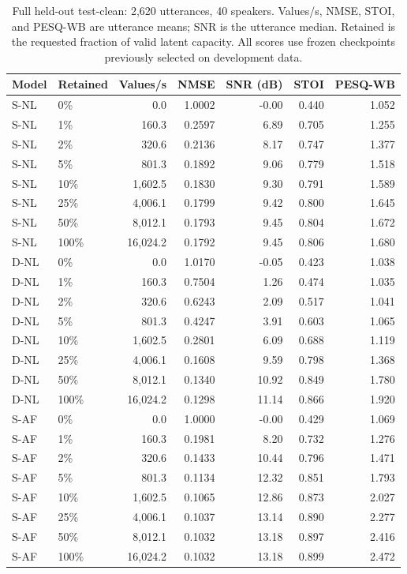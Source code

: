 \begin{table}[!htbp]
\centering\small
\begin{tabular}{llrrrrr}
\toprule
Model & Retained & Values/s & NMSE & SNR (dB) & STOI & PESQ-WB \\
\midrule
S-NL & 0\% & 0.0 & 1.0002 & -0.00 & 0.440 & 1.052 \\
S-NL & 1\% & 160.3 & 0.2597 & 6.89 & 0.705 & 1.255 \\
S-NL & 2\% & 320.6 & 0.2136 & 8.17 & 0.747 & 1.377 \\
S-NL & 5\% & 801.3 & 0.1892 & 9.06 & 0.779 & 1.518 \\
S-NL & 10\% & 1,602.5 & 0.1830 & 9.30 & 0.791 & 1.589 \\
S-NL & 25\% & 4,006.1 & 0.1799 & 9.42 & 0.800 & 1.645 \\
S-NL & 50\% & 8,012.1 & 0.1793 & 9.45 & 0.804 & 1.672 \\
S-NL & 100\% & 16,024.2 & 0.1792 & 9.45 & 0.806 & 1.680 \\
\midrule
D-NL & 0\% & 0.0 & 1.0170 & -0.05 & 0.423 & 1.038 \\
D-NL & 1\% & 160.3 & 0.7504 & 1.26 & 0.474 & 1.035 \\
D-NL & 2\% & 320.6 & 0.6243 & 2.09 & 0.517 & 1.041 \\
D-NL & 5\% & 801.3 & 0.4247 & 3.91 & 0.603 & 1.065 \\
D-NL & 10\% & 1,602.5 & 0.2801 & 6.09 & 0.688 & 1.119 \\
D-NL & 25\% & 4,006.1 & 0.1608 & 9.59 & 0.798 & 1.368 \\
D-NL & 50\% & 8,012.1 & 0.1340 & 10.92 & 0.849 & 1.780 \\
D-NL & 100\% & 16,024.2 & 0.1298 & 11.14 & 0.866 & 1.920 \\
\midrule
S-AF & 0\% & 0.0 & 1.0000 & -0.00 & 0.429 & 1.069 \\
S-AF & 1\% & 160.3 & 0.1981 & 8.20 & 0.732 & 1.276 \\
S-AF & 2\% & 320.6 & 0.1433 & 10.44 & 0.796 & 1.471 \\
S-AF & 5\% & 801.3 & 0.1134 & 12.32 & 0.851 & 1.793 \\
S-AF & 10\% & 1,602.5 & 0.1065 & 12.86 & 0.873 & 2.027 \\
S-AF & 25\% & 4,006.1 & 0.1037 & 13.14 & 0.890 & 2.277 \\
S-AF & 50\% & 8,012.1 & 0.1032 & 13.18 & 0.897 & 2.416 \\
S-AF & 100\% & 16,024.2 & 0.1032 & 13.18 & 0.899 & 2.472 \\
\bottomrule
\end{tabular}
\caption{Full held-out test-clean: 2,620 utterances, 40 speakers. Values/s, NMSE, STOI, and PESQ-WB are utterance means; SNR is the utterance median. Retained is the requested fraction of valid latent capacity. All scores use frozen checkpoints previously selected on development data.}
\label{tab:test-results}
\end{table}
